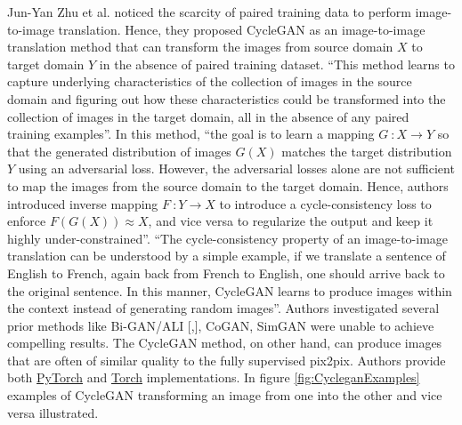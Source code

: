 Jun-Yan Zhu et al.\cite{zhu2020unpaired} noticed the scarcity of 	paired training data to perform image-to-image translation. Hence, they proposed \ac{CycleGAN} as an image-to-image translation method that can transform the images from source domain $X$ to target domain $Y$ in the absence of paired training dataset. ``This method learns to capture underlying characteristics of the collection of images in the source domain and figuring out how these characteristics could be transformed into the collection of images in the target domain, all in the absence of any paired training examples''\cite{zhu2020unpaired}. In this method, ``the goal is to learn a mapping $G\ \colon X \rightarrow Y$ so that the generated distribution of images $G(X)$ matches the target distribution $Y$ using an adversarial loss. However, the adversarial losses alone are not sufficient to map the images from the source domain to the target domain. Hence, authors introduced inverse mapping $F\ \colon Y \rightarrow X$ to introduce a cycle-consistency loss to enforce $F(G(X))\approx X$, and vice versa to regularize the output and keep it highly under-constrained''\cite{zhu2020unpaired}. ``The cycle-consistency property of an image-to-image translation can be understood by a simple example, if we translate a sentence of English to French, again back from French to English, one should arrive back to the original sentence. In this manner, \ac{CycleGAN} learns to produce images within the context instead of generating random images''\footnotemark. Authors investigated several prior methods like Bi-GAN/ALI [\cite{donahue2017adversarial},\cite{dumoulin2017adversarially}], CoGAN\cite{liu2016coupled}, SimGAN\cite{shrivastava2017learning} were unable to achieve compelling results. The \ac{CycleGAN} method, on other hand, can produce images that are often of similar quality to the fully supervised pix2pix\cite{isola2018imagetoimage}. Authors provide both \href{https://github.com/junyanz/pytorch-CycleGAN-and-pix2pix}{PyTorch} and \href{https://github.com/junyanz/CycleGAN}{Torch} implementations. In figure \ref{fig:CycleganExamples} examples of \ac{CycleGAN} transforming an image from one into the other and vice versa illustrated.


